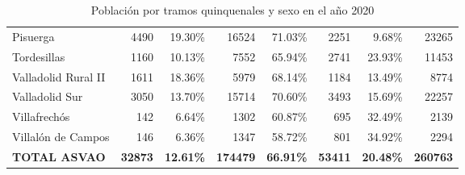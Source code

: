 \begin{table}[H]
\begin{tabular}{lrrrrrrr}
        Pisuerga                 & 4490           & 19.30\%          & 16524           & 71.03\%          & 2251           & 9.68\%           & 23265            \\
        Tordesillas              & 1160           & 10.13\%          & 7552            & 65.94\%          & 2741           & 23.93\%          & 11453            \\
        Valladolid Rural II      & 1611           & 18.36\%          & 5979            & 68.14\%          & 1184           & 13.49\%          & 8774             \\
        Valladolid Sur           & 3050           & 13.70\%          & 15714           & 70.60\%          & 3493           & 15.69\%          & 22257            \\
        Villafrechós             & 142            & 6.64\%           & 1302            & 60.87\%          & 695            & 32.49\%          & 2139             \\
        Villalón de Campos       & 146            & 6.36\%           & 1347            & 58.72\%          & 801            & 34.92\%          & 2294             \\
        \midrule
        \textbf{TOTAL ASVAO}     & \textbf{32873} & \textbf{12.61\%} & \textbf{174479} & \textbf{66.91\%} & \textbf{53411} & \textbf{20.48\%} & \textbf{260763} \\
        \bottomrule
    \end{tabular}
    \caption{Población por tramos quinquenales y sexo en el año 2020}
\end{table}